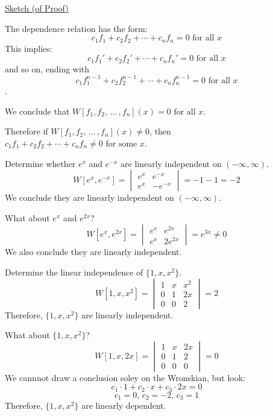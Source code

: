 \documentclass[../main.tex]{subfiles}
\begin{document}
\underline{Sketch (of Proof)}

The dependence relation has the form: \[ c_1f_1 + c_2f_2 + \cdots + c_nf_n = 0 \text{ for all } x \]
This implies: \[ c_1f_1' + c_2f_2' + \cdots + c_nf_n' = 0 \text{ for all } x \] and so on, ending with
\[ c_1f_1^{n-1} + c_2f_2^{n-1} + \cdots + c_nf_n^{n-1} = 0 \text{ for all } x \].

We conclude that \( W[f_1, f_2, \, \dots \, , f_n](x) = 0 \text{ for all } x \).

Therefore if \( W[f_1, f_2, \, \dots \, , f_n](x) \neq 0 \), then \( c_1f_1 + c_2f_2 + \cdots + c_nf_n \neq 0 \text{ for some } x \).

\begin{example}[Exponentials]
    Determine whether \( e^x \) and \( e^{-x} \) are linearly independent on \( (-\infty,\infty) \).
    \[ W[e^x,e^{-x}] =
    \begin{vmatrix}
        e^x & e^{-x} \\
        e^x & -e^{-x}
    \end{vmatrix}
    = -1-1 = -2 \]
    We conclude they are linearly independent on \( (-\infty,\infty) \).

    What about \( e^x\) and \( e^{2x} \)?
    \[ W[e^x,e^{2x}] =
    \begin{vmatrix}
        e^x & e^{2x} \\
        e^x & 2e^{2x}
    \end{vmatrix}
    = e^{3x} \neq 0 \]
    We also conclude they are linearly independent.
\end{example}

\begin{example}[\( P_2(x) \)]
    Determine the linear independence of \( \{1,x,x^2\} \).
    \[ W[1,x,x^2] =
    \begin{vmatrix}
        1 & x & x^2 \\
        0 & 1 & 2x \\
        0 & 0 & 2
    \end{vmatrix}
    = 2 \]
    Therefore, \( \{1,x,x^2\} \) are linearly independent.

    What about \( \{1,x,x^2\} \)?
    \[ W[1,x,2x] =
    \begin{vmatrix}
        1 & x & 2x \\
        0 & 1 & 2 \\
        0 & 0 & 0
    \end{vmatrix}
    = 0 \]
    We cannnot draw a conclusion soley on the Wronskian, but look:
    \[ c_1 \cdot 1 + c_2 \cdot x + c_3 \cdot 2x = 0 \]
    \[ c_1 = 0, \, c_2 = -2, \, c_3 = 1 \]
    Therefore, \( \{1,x,x^2\} \) are linearly dependent.
\end{example}
\end{document}

